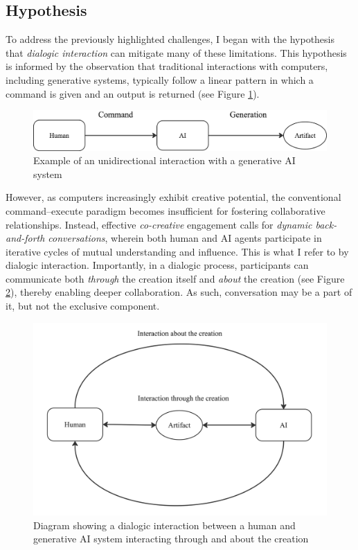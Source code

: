 \subsection{Hypothesis}

To address the previously highlighted challenges, I began with the hypothesis that \emph{dialogic interaction} can mitigate many of these limitations. This hypothesis is informed by the observation that traditional interactions with computers, including generative systems, typically follow a linear pattern in which a command is given and an output is returned (see Figure \ref{fig:unidirectional}). 

\begin{figure}[hbt!]
    \centering
    \includegraphics[width=0.75\linewidth]{unidirectional.png}
    \caption{Example of an unidirectional interaction with a generative AI system}
    \label{fig:unidirectional}
\end{figure}

However, as computers increasingly exhibit creative potential, the conventional command--execute paradigm becomes insufficient for fostering collaborative relationships. Instead, effective \emph{co-creative} engagement calls for \emph{dynamic back-and-forth conversations}, wherein both human and AI agents participate in iterative cycles of mutual understanding and influence. This is what I refer to by dialogic interaction. Importantly, in a dialogic process, participants can communicate both \emph{through} the creation itself and \emph{about} the creation (see Figure \ref{fig:dialogicthroughandabout}), thereby enabling deeper collaboration. As such, conversation may be a part of it, but not the exclusive component. 

\begin{figure}
    \centering
    \includegraphics[width=0.75\linewidth]{dialogicthroughandabout.jpg}
    \caption{Diagram showing a dialogic interaction between a human and generative AI system interacting through and about the creation}
    \label{fig:dialogicthroughandabout}
\end{figure}

